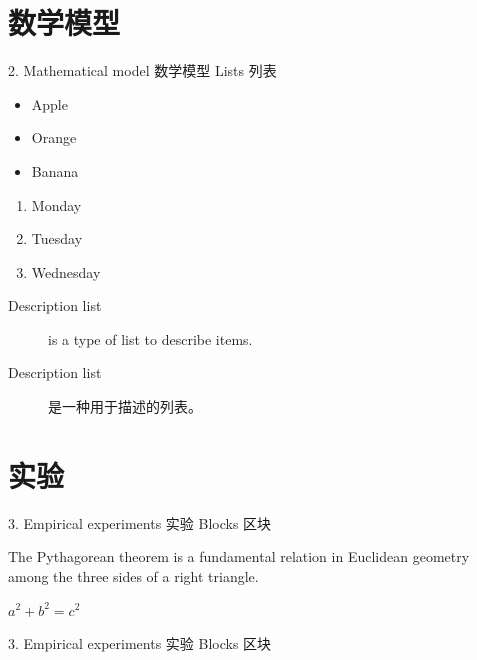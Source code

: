 \documentclass[CJKutf8]{beamer}
\begin{document}
\begin{CJK*}{UTF8}{gbsn}
  \section{数学模型}
  \label{Sec:model}
  \begin{frame}{2. Mathematical model 数学模型}
    Lists 列表

    \begin{itemize}
    \item Apple
    \item Orange
    \item Banana
    \end{itemize}

    \begin{enumerate}
    \item Monday
    \item Tuesday
    \item Wednesday
    \end{enumerate}

    \begin{description}
    \item[Description list] is a type of list to describe items.
    \item[Description list] 是一种用于描述的列表。
    \end{description}
  \end{frame} %

  \section{实验}
  \label{Sec:experiments}
  \begin{frame}{3. Empirical experiments 实验}
    Blocks 区块

      \begin{definition}
        The Pythagorean theorem is a fundamental relation in Euclidean geometry among the three sides of a right triangle.
      \end{definition}

      \begin{theorem}
        $a^2 + b^2 = c^2$
      \end{theorem}
  \end{frame} %

  \begin{frame}{3. Empirical experiments 实验}
    Blocks 区块


\end{frame}
\end{CJK*}
\end{document}
